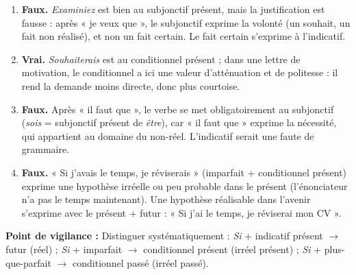 \documentclass[11pt]{article}
\newcommand{\cle}[1]{{\popxbold\color{popdark}#1}}
\begin{document}
\begin{corrige}
\begin{enumerate}
\item \textbf{Faux.} \emph{Examiniez} est bien au subjonctif présent, mais la justification est fausse : après « je veux que », le subjonctif exprime la \cle{volonté} (un souhait, un fait non réalisé), et non un fait certain. Le fait certain s'exprime à l'indicatif.
\item \textbf{Vrai.} \emph{Souhaiterais} est au conditionnel présent ; dans une lettre de motivation, le conditionnel a ici une valeur d'\cle{atténuation} et de politesse : il rend la demande moins directe, donc plus courtoise.
\item \textbf{Faux.} Après « il faut que », le verbe se met obligatoirement au \cle{subjonctif} (\emph{sois} = subjonctif présent de \emph{être}), car « il faut que » exprime la nécessité, qui appartient au domaine du non-réel. L'indicatif serait une faute de grammaire.
\item \textbf{Faux.} « Si j'avais le temps, je réviserais » (imparfait + conditionnel présent) exprime une hypothèse \cle{irréelle ou peu probable dans le présent} (l'énonciateur n'a pas le temps maintenant). Une hypothèse réalisable dans l'avenir s'exprime avec le présent + futur : « Si j'ai le temps, je réviserai mon CV ».
\end{enumerate}

\textbf{Point de vigilance :} Distinguer systématiquement : \emph{Si} + indicatif présent $\to$ futur (réel) ; \emph{Si} + imparfait $\to$ conditionnel présent (irréel présent) ; \emph{Si} + plus-que-parfait $\to$ conditionnel passé (irréel passé).
\end{corrige}
\end{document}
